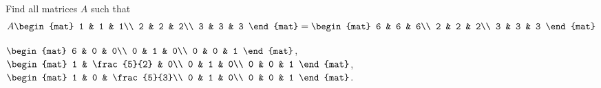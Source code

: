 
\begin{Exercise}[
name={},
title={}, 
difficulty=0,
origin={\cite{BS}}]
Find all matrices $A$ such that 
\[
A\begin{mat}
1 & 1 & 1\\
2 & 2 & 2\\
3 & 3 & 3
\end{mat}
=
\begin{mat}
6 & 6 & 6\\
2 & 2 & 2\\
3 & 3 & 3
\end{mat}
\]
\end{Exercise}
\begin{Answer}
$\begin{mat}
6 & 0 & 0\\
0 & 1 & 0\\
0 & 0 & 1
\end{mat}$,
$\begin{mat}
1 & \frac{5}{2} & 0\\
0 & 1 & 0\\
0 & 0 & 1
\end{mat}$,
$\begin{mat}
1 & 0 & \frac{5}{3}\\
0 & 1 & 0\\
0 & 0 & 1
\end{mat}$.

\end{Answer}
